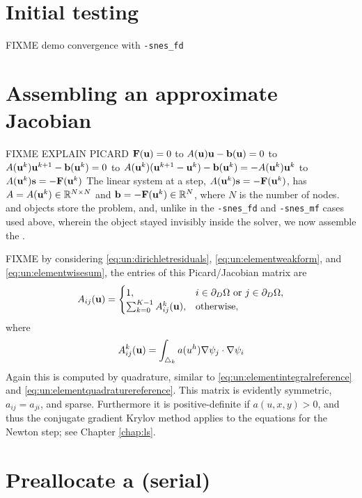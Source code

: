 \section{Initial testing}

FIXME demo convergence with \texttt{-snes\_fd}


\section{Assembling an approximate Jacobian}

FIXME EXPLAIN PICARD $\mathbf{F}(\mathbf{u})=0$ to $A(\mathbf{u}) \mathbf{u} - \mathbf{b}(\mathbf{u})=0$ to $A(\mathbf{u}^k) \mathbf{u}^{k+1} - \mathbf{b}(\mathbf{u}^k)=0$ to $A(\mathbf{u}^k) (\mathbf{u}^{k+1}-\mathbf{u}^k) - \mathbf{b}(\mathbf{u}^k)= - A(\mathbf{u}^k) \mathbf{u}^k$ to $A(\mathbf{u}^k) \mathbf{s} = -\mathbf{F}(\mathbf{u}^k)$  The linear system at a step, $A(\mathbf{u}^k) \mathbf{s} = -\mathbf{F}(\mathbf{u}^k)$, has $A=A(\mathbf{u}^k)\in\mathbb{R}^{N\times N}$ and $\mathbf{b}=-\mathbf{F}(\mathbf{u}^k)\in\mathbb{R}^N$, where $N$ is the number of nodes.  \pMat and \pVec objects store the problem, and, unlike in the \texttt{-snes\_fd} and \texttt{-snes\_mf} cases used above, wherein the \pMat object stayed invisibly inside the \pSNES solver, we now assemble the \pMat.

FIXME by considering \eqref{eq:un:dirichletresiduals}, \eqref{eq:un:elementweakform}, and \eqref{eq:un:elementwisesum}, the entries of this Picard/Jacobian matrix are
\begin{equation}
A_{ij}(\mathbf{u}) =  \begin{cases}
               1, & i \in \partial_D\Omega \text{ or } j \in \partial_D\Omega, \\
               \sum_{k=0}^{K-1} A_{ij}^k(\mathbf{u}), & \text{otherwise},
               \end{cases} \label{eq:un:picardentry}
\end{equation}
where
\begin{equation}
A_{ij}^k(\mathbf{u}) = \int_{\triangle_k} a(u^h) \nabla\psi_j \cdot \nabla\psi_i \label{eq:un:picardentryelement}
\end{equation}
Again this is computed by quadrature, similar to \eqref{eq:un:elementintegralreference} and \eqref{eq:un:elementquadraturereference}.  This matrix is evidently symmetric, $a_{ij}=a_{ji}$, and sparse.  Furthermore it is positive-definite if $a(u,x,y)>0$, and thus the conjugate gradient Krylov method applies to the equations for the Newton step; see Chapter \ref{chap:ls}.

\section{Preallocate a \pMat (serial)}

